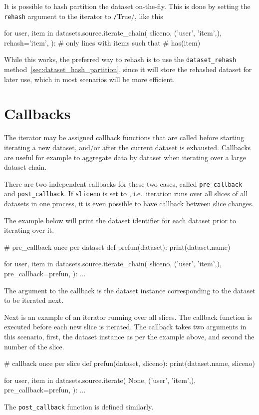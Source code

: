 It is possible to hash partition the dataset on-the-fly.  This is done
by setting the \texttt{rehash} argument to the iterator to
\texttt/True/, like this
\begin{python}
for user, item in datasets.source.iterate_chain(
    sliceno,
    ('user', 'item',),
    rehash='item',
):
    # only lines with items such that
    # has(item) %
\end{python}
While this works, the preferred way to rehash is to use the
\texttt{dataset\_rehash} method~\ref{sec:dataset_hash_partition},
since it will store the rehashed dataset for later use, which in most
scenarios will be more efficient.






\section{Callbacks}
\label{sec:callback}
The iterator may be assigned callback functions that are called before
starting iterating a new dataset, and/or after the current dataset is
exhausted.  Callbacks are useful for example to aggregate data by
dataset when iterating over a large dataset chain.

There are two independent callbacks for these two cases,
called \texttt{pre\_callback} and \texttt{post\_callback}.
If \texttt{sliceno} is set to \pyNone, i.e.\ iteration runs over all
slices of all datasets in one process, it is even possible to have
callback between slice changes.

The example below will print the dataset identifier for each dataset
prior to iterating over it.
\begin{python}
# pre_callback once per dataset
def prefun(dataset):
    print(dataset.name)

for user, item in datasets.source.iterate_chain(
    sliceno,
    ('user', 'item',),
    pre_callback=prefun,
):
    ...
\end{python}
The argument to the callback is the dataset instance corresponding to
the dataset to be iterated next.

Next is an example of an iterator running over all slices.  The
callback function is executed before each new slice is iterated.  The
callback takes two arguments in this scenario, first, the dataset
instance as per the example above, and second the number of the slice.
\begin{python}
# callback once per slice
def prefun(dataset, sliceno):
    print(dataset.name, sliceno)

for user, item in datasets.source.iterate(
    None,
    ('user', 'item',),
    pre_callback=prefun,
):
    ...
\end{python}
The \texttt{post\_callback} function is defined similarly.


